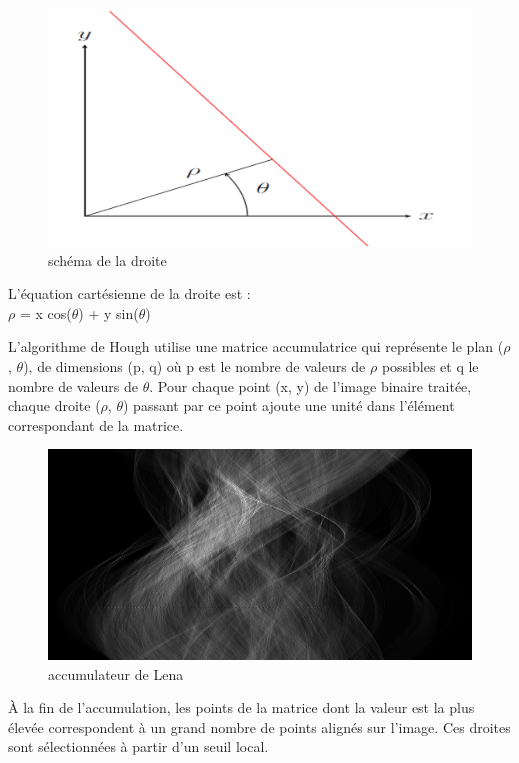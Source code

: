\documentclass[11pt]{article}
\begin{document}
	\begin{figure}[H]
		\centering
		\includegraphics[scale=0.15]{Image/triangle.png}
		\caption{schéma de la droite}
		\label{fig:triangle}
	\end{figure} 


	L'équation cartésienne de la droite est : \\
	$\rho$ = x cos($\theta$)  + y sin($\theta$)

	L'algorithme de Hough utilise une matrice accumulatrice qui représente le plan ($\rho$, $\theta$), de
	dimensions (p, q) où p est le nombre de valeurs de $\rho$ possibles et q le nombre de valeurs
	de $\theta$. Pour chaque point (x, y) de l'image binaire traitée, chaque droite ($\rho$, $\theta$) passant
	par ce point ajoute une unité dans l'élément correspondant de la matrice. 

	\begin{figure}[H]
		\centering
		\includegraphics[scale=0.25]{Image/accumulateur.png}
		\caption{accumulateur de Lena}
		\label{fig:triangle}
	\end{figure} 

	À la fin de l'accumulation, les points de la matrice dont la valeur est la plus élevée correspondent
	à un grand nombre de points alignés sur l'image. 
	Ces droites sont sélectionnées à partir	d'un seuil local.
\end{document}
